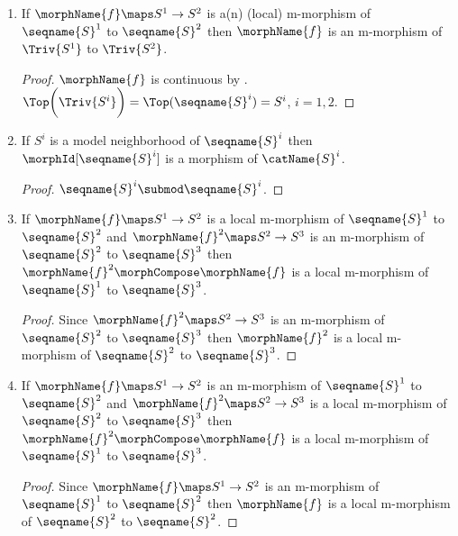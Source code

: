 \documentclass{article}
\begin{document}
\begin{corollary}
\begin{enumerate}
\begin{proof}
$\morphName{f} \maps S^1 \to S'^2$ is continuous by
.
\end{proof}

\item
If $\morphName{f} \maps S^1 \to S^2$ is a(n) (local) m-morphism of
$\seqname{S}^1$ to $\seqname{S}^2$ then $\morphName{f}$ is an m-morphism
of $\Triv{S^1}$ to $\Triv{S^2}$.

\begin{proof}
$\morphName{f}$ is continuous by .
$
  \Top \biggl ( \Triv{S^i} \biggr ) =
  \Top(\seqname{S}^i) =
  S^i
$,
$i=1,2$.
\end{proof}

\item
If $S^i$ is a model neighborhood of $\seqname{S}^i$ then
$\morphId[{\seqname{S}^i}]$ is a morphism of $\catName{S}^i$.

\begin{proof}
$\seqname{S}^i \submod \seqname{S}^i$.
\end{proof}

\item
If $\morphName{f} \maps S^1 \to S^2$ is a local m-morphism of
$\seqname{S}^1$ to $\seqname{S}^2$ and
$\morphName{f}^2 \maps S^2 \to S^3$ is an m-morphism of $\seqname{S}^2$
to $\seqname{S}^3$ then $\morphName{f}^2 \morphCompose \morphName{f}$ is a
local m-morphism of $\seqname{S}^1$ to $\seqname{S}^3$.

\begin{proof}
Since $\morphName{f}^2 \maps S^2 \to S^3$ is an m-morphism of
$\seqname{S}^2$ to $\seqname{S}^3$ then $\morphName{f}^2$ is a local
m-morphism of $\seqname{S}^2$ to $\seqname{S}^3$.
\end{proof}

\item
If $\morphName{f} \maps S^1 \to S^2$ is an m-morphism of
$\seqname{S}^1$ to $\seqname{S}^2$ and
$\morphName{f}^2 \maps S^2 \to S^3$ is a local m-morphism of
$\seqname{S}^2$ to $\seqname{S}^3$ then
$\morphName{f}^2 \morphCompose \morphName{f}$ is a local m-morphism of
$\seqname{S}^1$ to $\seqname{S}^3$.

\begin{proof}
Since $\morphName{f} \maps S^1 \to S^2$ is an m-morphism of
$\seqname{S}^1$ to $\seqname{S}^2$ then $\morphName{f}$ is a local
m-morphism of $\seqname{S}^2$ to $\seqname{S}^2$.
\end{proof}


\end{enumerate}
\end{corollary}
\end{document}
